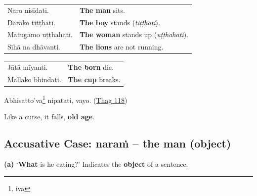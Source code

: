 \documentclass[11pt,oneside]{memoir}
\begin{document}
\bigskip

\begin{widecols}


\begin{center}
\begin{tabular}{ll}
Naro nisīdati. & \textbf{The man} sits.\\[0pt]
Dārako tiṭṭhati. & \textbf{The boy} stands (\emph{tiṭṭhati}).\\[0pt]
Mātugāmo uṭṭhahati. & \textbf{The woman} stands up (\emph{uṭṭhahati}).\\[0pt]
Sīhā na dhāvanti. & \textbf{The lions} are not running.\\[0pt]
\end{tabular}
\end{center}

\columnbreak

\begin{center}
\begin{tabular}{ll}
Jātā mīyanti. & \textbf{The born} die.\\[0pt]
Mallako bhindati. & \textbf{The cup} breaks.\\[0pt]
\end{tabular}
\end{center}

{\centering

Abhisatto'va\footnote{iva} nipatati, vayo. (\href{https://suttacentral.net/thag1.118/pli/ms}{Thag 118})

Like a curse, it falls, \textbf{old age}.

\mbox{}

\par}
\end{widecols}

\clearpage

\subsection{Accusative Case: naraṁ -- the man (object)}
\label{sec:org8e951bb}

\textbf{(a)} `\textbf{What} is he eating?' Indicates the \textbf{object} of a sentence.

\renewcommand{\arraystretch}{1.8}
\end{document}
